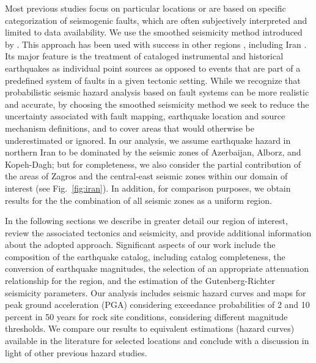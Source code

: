 Most previous studies focus on particular locations or are based on specific categorization of seismogenic faults, which are often subjectively interpreted and limited to data availability. We use the smoothed seismicity method introduced by \citet{Frankel1995}. This approach has been used with success in other regions \citep[e.g.][]{Cao1996, Akinci2004, Kalkan2009}, including Iran \citep{Khodaverdian_2016_BSSA}. Its major feature is the treatment of cataloged instrumental and historical earthquakes as individual point sources as opposed to events that are part of a predefined system of faults in a given tectonic setting. While we recognize that probabilistic seismic hazard analysis based on fault systems can be more realistic and accurate, by choosing the smoothed seismicity method we seek to reduce the uncertainty associated with fault mapping, earthquake location and source mechanism definitions, and to cover areas that would otherwise be underestimated or ignored. In our analysis, we assume earthquake hazard in northern Iran to be dominated by the seismic zones of Azerbaijan, Alborz, and Kopeh-Dagh; but for completeness, we also consider the partial contribution of the areas of Zagros and the central-east seismic zones within our domain of interest (see Fig.~\ref{fig:iran}). In addition, for comparison purposes, we obtain results for the the combination of all seismic zones as a uniform region.

In the following sections we describe in greater detail our region of interest, review the associated tectonics and seismicity, and provide additional information about the adopted approach. Significant aspects of our work include the composition of the earthquake catalog, including catalog completeness, the conversion of earthquake magnitudes, the selection of an appropriate attenuation relationship for the region, and the estimation of the Gutenberg-Richter seismicity parameters. Our analysis includes seismic hazard curves and maps for peak ground acceleration (PGA) considering exceedance probabilities of 2 and 10 percent in 50 years for rock site conditions, considering different magnitude thresholds. We compare our results to equivalent estimations (hazard curves) available in the literature for selected locations and conclude with a discussion in light of other previous hazard studies.





